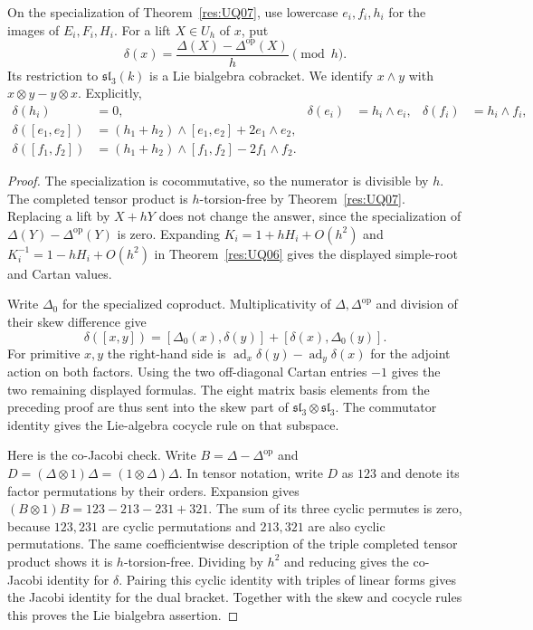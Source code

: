 \begin{theorem}
\label{res:UQ08}
On the specialization of Theorem~\ref{res:UQ07}, use
lowercase \(e_i,f_i,h_i\) for the images of \(E_i,F_i,H_i\).
For a lift \(X\in U_h\) of \(x\), put
\[
 \delta(x)=\frac{\Delta(X)-\Delta^{\mathrm{op}}(X)}h
             \pmod h .
\]
Its restriction to \(\mathfrak{sl}_3(k)\) is a Lie
bialgebra cobracket. We identify \(x\wedge y\) with
\(x\otimes y-y\otimes x\). Explicitly,
\[
\begin{aligned}
 \delta(h_i)&=0, &
 \delta(e_i)&=h_i\wedge e_i, &
 \delta(f_i)&=h_i\wedge f_i,\\
 \delta([e_1,e_2])&=(h_1+h_2)\wedge[e_1,e_2]+2e_1\wedge e_2,\\
 \delta([f_1,f_2])&=(h_1+h_2)\wedge[f_1,f_2]-2f_1\wedge f_2 .
\end{aligned}
\]
\end{theorem}
\begin{proof}
The specialization is cocommutative, so the numerator
is divisible by \(h\). The completed tensor product
is \(h\)-torsion-free by Theorem~\ref{res:UQ07}.
Replacing a lift by \(X+hY\) does not change the
answer, since the specialization of
\(\Delta(Y)-\Delta^{\mathrm{op}}(Y)\) is zero.
Expanding \(K_i=1+hH_i+O(h^2)\) and
\(K_i^{-1}=1-hH_i+O(h^2)\) in Theorem~\ref{res:UQ06}
gives the displayed simple-root and Cartan values.

Write \(\Delta_0\) for the specialized coproduct.
Multiplicativity of \(\Delta,\Delta^{\mathrm{op}}\)
and division of their skew difference give
\[
 \delta([x,y])=[\Delta_0(x),\delta(y)]
                  +[\delta(x),\Delta_0(y)] .
\]
For primitive \(x,y\) the right-hand side is
\(\operatorname{ad}_x\delta(y)-\operatorname{ad}_y\delta(x)\)
for the adjoint action on both factors. Using the
two off-diagonal Cartan entries \(-1\) gives
the two remaining displayed formulas. The eight
matrix basis elements from the preceding proof are thus
sent into the skew part of \(\mathfrak{sl}_3\otimes\mathfrak{sl}_3\).
The commutator identity gives the Lie-algebra cocycle rule
on that subspace.

Here is the co-Jacobi check. Write \(B=\Delta-\Delta^{\mathrm{op}}\)
and \(D=(\Delta\otimes1)\Delta=(1\otimes\Delta)\Delta\).
In tensor notation, write \(D\) as \(123\) and denote
its factor permutations by their orders. Expansion gives
\((B\otimes1)B=123-213-231+321\).
The sum of its three cyclic permutes is zero, because
\(123,231\) are cyclic permutations and \(213,321\) are
also cyclic permutations. The same coefficientwise
description of the triple completed tensor product
shows it is \(h\)-torsion-free. Dividing by \(h^2\)
and reducing gives the co-Jacobi identity for \(\delta\).
Pairing this cyclic identity with triples of linear forms
gives the Jacobi identity for the dual bracket. Together
with the skew and cocycle rules this proves the Lie
bialgebra assertion.
\end{proof}

